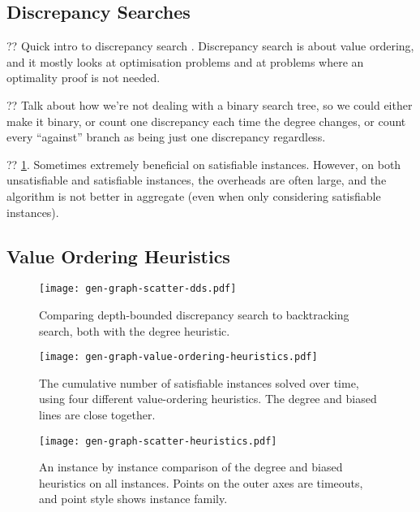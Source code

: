 \documentclass{article}
\newcommand{\citep}[1]{\cite{#1}}
\begin{document}
\subsection{Discrepancy Searches}

?? Quick intro to discrepancy search
\citep{DBLP:conf/ijcai/HarveyG95,DBLP:conf/aaai/Korf96,DBLP:conf/ijcai/Walsh97,DBLP:conf/cpaior/KarouiHLN07,DBLP:journals/jea/ProsserU11}.
Discrepancy search is about value ordering, and it mostly looks at optimisation problems and at
problems where an optimality proof is not needed.

?? Talk about how we're not dealing with a binary search tree, so we could either make it binary, or
count one discrepancy each time the degree changes, or count every ``against'' branch as being just
one discrepancy regardless.

?? \cref{figure:scatter-dds}. Sometimes extremely beneficial on satisfiable instances. However, on both
unsatisfiable and satisfiable instances, the overheads are often large, and the algorithm is not
better in aggregate (even when only considering satisfiable instances).

\subsection{Value Ordering Heuristics}

\begin{figure}[p]
    \centering
    \texttt{[image: gen-graph-scatter-dds.pdf]}

    \caption{Comparing depth-bounded discrepancy search to backtracking search, both with the degree
    heuristic.}\label{figure:scatter-dds}
\end{figure}

\begin{figure}[p]
    \centering
    \texttt{[image: gen-graph-value-ordering-heuristics.pdf]}

    \caption{The cumulative number of satisfiable instances solved over time, using four
    different value-ordering heuristics. The degree and biased lines are close together.}
    \label{figure:value-ordering-heuristics}
\end{figure}

\begin{figure}[p]
    \centering
    \texttt{[image: gen-graph-scatter-heuristics.pdf]}

    \caption{An instance by instance comparison of the degree and biased heuristics on all
    instances. Points on the outer axes are timeouts, and point style shows instance family.}
    \label{figure:scatter-heuristics}
\end{figure}
\end{document}
